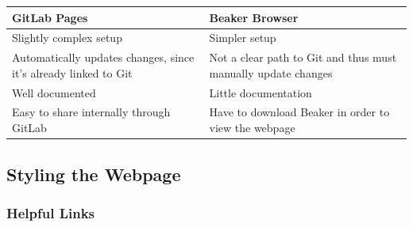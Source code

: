\documentclass[openany]{book}
\begin{document}
\begin{longtable}[]{@{}ll@{}}
\toprule
\begin{minipage}[b]{0.47\columnwidth}\raggedright
GitLab Pages\strut
\end{minipage} & \begin{minipage}[b]{0.47\columnwidth}\raggedright
Beaker Browser\strut
\end{minipage}\tabularnewline
\midrule
\endhead
\begin{minipage}[t]{0.47\columnwidth}\raggedright
Slightly complex setup\strut
\end{minipage} & \begin{minipage}[t]{0.47\columnwidth}\raggedright
Simpler setup\strut
\end{minipage}\tabularnewline
\begin{minipage}[t]{0.47\columnwidth}\raggedright
Automatically updates changes, since it's already linked to Git\strut
\end{minipage} & \begin{minipage}[t]{0.47\columnwidth}\raggedright
Not a clear path to Git and thus must manually update changes\strut
\end{minipage}\tabularnewline
\begin{minipage}[t]{0.47\columnwidth}\raggedright
Well documented\strut
\end{minipage} & \begin{minipage}[t]{0.47\columnwidth}\raggedright
Little documentation\strut
\end{minipage}\tabularnewline
\begin{minipage}[t]{0.47\columnwidth}\raggedright
Easy to share internally through GitLab\strut
\end{minipage} & \begin{minipage}[t]{0.47\columnwidth}\raggedright
Have to download Beaker in order to view the webpage\strut
\end{minipage}\tabularnewline
\bottomrule
\end{longtable}

\hypertarget{styling-the-webpage}{%
\subsection{Styling the Webpage}\label{styling-the-webpage}}

\hypertarget{helpful-links}{%
\subsubsection{Helpful Links}\label{helpful-links}}
\end{document}
